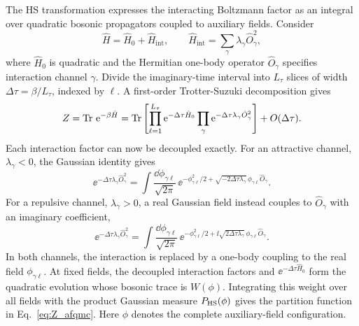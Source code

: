 The HS transformation expresses the interacting Boltzmann factor as an integral over quadratic bosonic propagators coupled to auxiliary fields. Consider
\begin{equation}
    \hat H=\hat H_0+\hat H_{\mathrm{int}},\qquad
    \hat H_{\mathrm{int}}=\sum_\gamma\lambda_\gamma\hat O_\gamma^2,
\end{equation}
where $\hat H_0$ is quadratic and the Hermitian one-body operator $\hat O_\gamma$ specifies interaction channel $\gamma$. Divide the imaginary-time interval into $L_\tau$ slices of width $\Delta\tau=\beta/L_\tau$, indexed by $\ell$. A first-order Trotter-Suzuki decomposition gives
\begin{equation}
    Z=\operatorname{Tr}\,\mathrm{e}^{-\beta\hat H}
    =\operatorname{Tr}\left[\prod_{\ell=1}^{L_\tau}\mathrm{e}^{-\Delta\tau\hat H_0}
    \prod_\gamma\mathrm{e}^{-\Delta\tau\lambda_\gamma\hat O_\gamma^2}\right]+O(\Delta\tau).
\end{equation}
Each interaction factor can now be decoupled exactly. For an attractive channel, $\lambda_\gamma<0$, the Gaussian identity gives
\begin{equation}
    \ee^{-\Delta\tau\lambda_\gamma\hat O_\gamma^2}
    =
    \int\frac{\dd\phi_{\gamma\ell}}{\sqrt{2\pi}}\,
    \ee^{-\phi_{\gamma\ell}^{2}/2
    +\sqrt{-2\Delta\tau\lambda_\gamma}\,\phi_{\gamma\ell}\hat O_\gamma}.
    \label{eq:hs_attractive}
\end{equation}
For a repulsive channel, $\lambda_\gamma>0$, a real Gaussian field instead couples to $\hat O_\gamma$ with an imaginary coefficient,
\begin{equation}
    \ee^{-\Delta\tau\lambda_\gamma\hat O_\gamma^2}
    =
    \int\frac{\dd\phi_{\gamma\ell}}{\sqrt{2\pi}}\,
    \ee^{-\phi_{\gamma\ell}^{2}/2
    +\ii\sqrt{2\Delta\tau\lambda_\gamma}\,\phi_{\gamma\ell}\hat O_\gamma}.
    \label{eq:hs_repulsive}
\end{equation}
In both channels, the interaction is replaced by a one-body coupling to the real field $\phi_{\gamma\ell}$. At fixed fields, the decoupled interaction factors and $\ee^{-\Delta\tau\hat H_0}$ form the quadratic evolution whose bosonic trace is $W(\phi)$. Integrating this weight over all fields with the product Gaussian measure $P_{\rm HS}(\phi)$ gives the partition function in Eq.~\eqref{eq:Z_afqmc}. Here $\phi$ denotes the complete auxiliary-field configuration.

